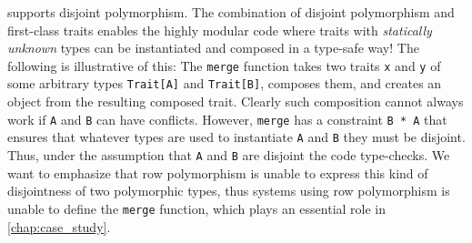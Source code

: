 \sedel supports disjoint polymorphism. The combination of disjoint
polymorphism and first-class traits enables the highly modular code
where traits with \emph{statically unknown} types can be instantiated
and composed in a type-safe way! The following is illustrative of this:
The \lstinline{merge} function takes two traits \lstinline{x} and \lstinline{y} of
some arbitrary types \lstinline{Trait[A]} and \lstinline{Trait[B]}, composes them,
and creates an object from the resulting composed trait. Clearly
such composition cannot always work if \lstinline{A} and
\lstinline{B} can have conflicts. However, \lstinline{merge} has a
constraint \lstinline{B * A} that ensures that whatever types are used
to instantiate \lstinline{A} and \lstinline{B} they must be disjoint.
Thus, under the assumption that \lstinline{A} and \lstinline{B} are
disjoint the code type-checks. We want to emphasize that row polymorphism is unable to express
this kind of disjointness of two polymorphic types, thus systems using row polymorphism is unable to define
the \lstinline{merge} function, which plays an essential role in \cref{chap:case_study}.

\begin{comment}
Notice the disjoint constraint on the type variable \lstinline{B} (\lstinline{B * A}), which is crucial
to ensure the composition of two traits \lstinline{x} and \lstinline{y} is conflict-free.
As far as we are aware, no mainstream statically typed OO languages can do this.
\end{comment}


